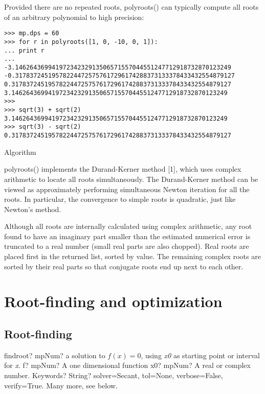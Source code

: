 Provided there are no repeated roots, polyroots() can typically compute all roots of an arbitrary polynomial to high precision:

\begin{lstlisting}
>>> mp.dps = 60
>>> for r in polyroots([1, 0, -10, 0, 1]):
... print r
...
-3.14626436994197234232913506571557044551247712918732870123249
-0.317837245195782244725757617296174288373133378433432554879127
0.317837245195782244725757617296174288373133378433432554879127
3.14626436994197234232913506571557044551247712918732870123249
>>>
>>> sqrt(3) + sqrt(2)
3.14626436994197234232913506571557044551247712918732870123249
>>> sqrt(3) - sqrt(2)
0.317837245195782244725757617296174288373133378433432554879127
\end{lstlisting}

Algorithm

polyroots() implements the Durand-Kerner method [1], which uses complex
arithmetic to locate all roots simultaneously. The Durand-Kerner method can be viewed as approximately performing simultaneous Newton iteration for all the roots. In particular, the convergence to simple roots is quadratic, just like Newton's method.

Although all roots are internally calculated using complex arithmetic, any root found to have an imaginary part smaller than the estimated numerical error is truncated to a real number (small real parts are also chopped). Real roots are placed first in the returned list, sorted by value. The remaining complex roots are sorted by their real parts so that conjugate roots end up next to each other.




\newpage
\chapter{Root-finding and optimization}

\section{Root-finding}


\begin{mpFunctionsExtract}
	\mpFunctionThree
	{findroot? mpNum?  a solution to $f(x)=0$, using \textit{x0} as starting point or interval for \textit{x}.}
	{f? mpNum? A one dimensional function}
	{x0? mpNum? A real or complex number.}	
	{Keywords? String? solver=Secant, tol=None, verbose=False, verify=True. Many more, see below.}	
\end{mpFunctionsExtract}

